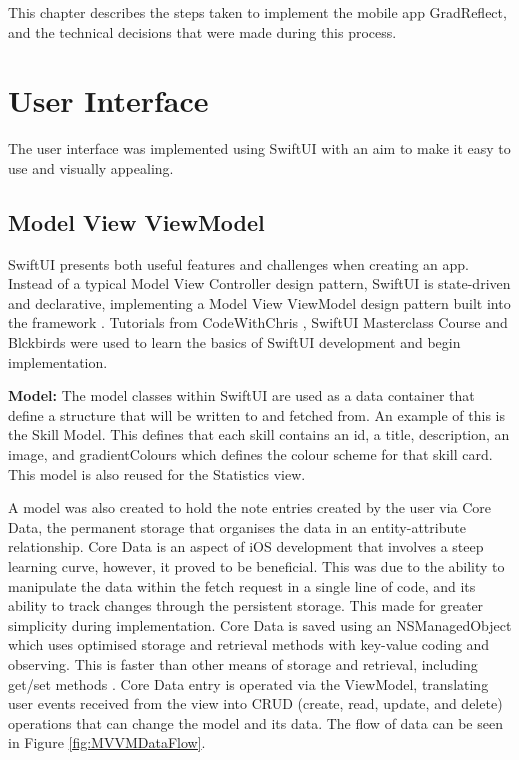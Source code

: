 \documentclass{l4proj}
\begin{document}
This chapter describes the steps taken to implement the mobile app GradReflect, and the technical decisions that were made during this process.

\section{User Interface}

The user interface was implemented using SwiftUI with an aim to make it easy to use and visually appealing. 

\subsection{Model View ViewModel}

SwiftUI presents both useful features and challenges when creating an app. Instead of a typical Model View Controller design pattern, SwiftUI is state-driven and declarative, implementing a Model View ViewModel design pattern built into the framework \citep{naumov_swiftui_architecture_2019}. Tutorials from CodeWithChris \citep{ching_codewithchris_2021}, SwiftUI Masterclass Course \citep{petras_swiftui_2021} and Blckbirds \citep{blckbirds_learn_2021} were used to learn the basics of SwiftUI development and begin implementation.

\textbf{Model:} The model classes within SwiftUI are used as a data container that define a structure that will be written to and fetched from. An example of this is the Skill Model. This defines that each skill contains an id, a title, description, an image, and gradientColours which defines the colour scheme for that skill card. This model is also reused for the Statistics view.

A model was also created to hold the note entries created by the user via Core Data, the permanent storage that organises the data in an entity-attribute relationship. Core Data is an aspect of iOS development that involves a steep learning curve, however, it proved to be beneficial. This was due to the ability to manipulate the data within the fetch request in a single line of code, and its ability to track changes through the persistent storage. This made for greater simplicity during implementation. Core Data is saved using an NSManagedObject which uses optimised storage and retrieval methods with key-value coding and observing. This is faster than other means of storage and retrieval, including get/set methods \citep{apple_developer_documentation_core_2021}. Core Data entry is operated via the ViewModel, translating user events received from the view into CRUD (create, read, update, and delete) operations that can change the model and its data. The flow of data can be seen in Figure \ref{fig:MVVMDataFlow}. 
\end{document}
